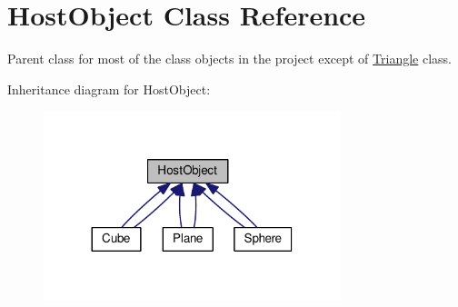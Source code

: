 \hypertarget{class_host_object}{}\section{Host\+Object Class Reference}
\label{class_host_object}


Parent class for most of the class objects in the project except of \hyperlink{class_triangle}{Triangle} class.  




Inheritance diagram for Host\+Object\+:
\nopagebreak
\begin{figure}[H]
\begin{center}
\leavevmode
\includegraphics[width=245pt]{class_host_object__inherit__graph}
\end{center}
\end{figure}
